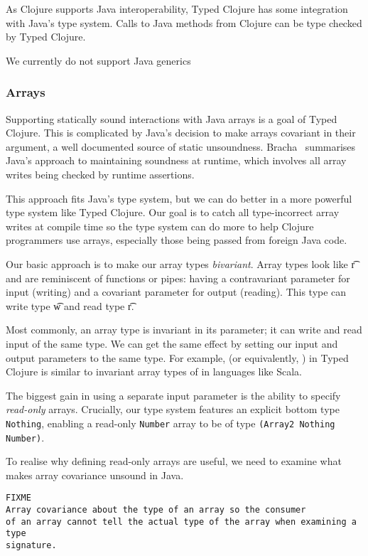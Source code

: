 \documentclass[preprint,10pt]{sigplanconf}
\begin{document}
As Clojure supports Java interoperability, Typed Clojure has some
integration with Java's type system. Calls to Java methods from
Clojure can be type checked by Typed Clojure.

We currently do not support Java generics

\subsubsection{Arrays}
\label{sec:arrays}

Supporting statically sound interactions with Java arrays is a goal
of Typed Clojure. This is complicated by Java's decision to make
arrays covariant in their argument, a well documented source of static
unsoundness. Bracha~\cite{Bra98} summarises Java's approach to maintaining
soundness at runtime, which involves all array writes being checked by
runtime assertions.

This approach fits Java's type system, but we can do better in a more powerful
type system like Typed Clojure. Our goal is to catch all type-incorrect array
writes at compile time so the type system can do more to help Clojure programmers
use arrays, especially those being passed from foreign Java code.

Our basic approach is to make our array types \emph{bivariant}. Array types
look like { {\t{r}}} and
are reminiscent of functions or pipes: having a contravariant parameter for input (writing)
and a covariant parameter for output (reading).
This type can write type {\t{w}} and read type {\t{r}}.

Most commonly, an array type is invariant in its parameter; it can
write and read input of the same type.
We can get the same effect by setting our input and output
parameters to the same type. For example, {\ArrayTwo {\Number} {\Number}}
(or equivalently, {\Array {\Number}})
in Typed Clojure is similar to invariant array types of \Number in languages like Scala.

The biggest gain in using a separate input parameter is the ability
to specify \emph{read-only} arrays. Crucially, our type system features an
explicit bottom type \lstinline|Nothing|, enabling a read-only \lstinline|Number| array
to be of type \lstinline|(Array2 Nothing Number)|.

To realise why defining read-only arrays are useful, we need to examine
what makes array covariance unsound in Java.
\begin{verbatim}
FIXME
Array covariance about the type of an array so the consumer
of an array cannot tell the actual type of the array when examining a type
signature.
\end{verbatim}
\end{document}
